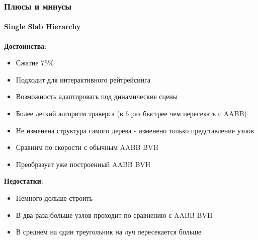 \documentclass{beamer}
\begin{document}
\begin{frame}[t]
    \frametitle{Плюсы и минусы}
    \framesubtitle{Single Slab Hierarchy}

    \textbf{Достоинства}:
    \begin{itemize}
        \item
            Сжатие 75\%
        \item
            Подходит для интерактивного рейтрейсинга
        \item
            Возможность адаптировать под динамические сцены
        \item
            Более легкий алгоритм траверса (в 6 раз быстрее чем пересекать с AABB)
        \item
            Не изменена структура самого дерева - изменено только представление узлов
        \item
            Сравним по скорости с обычным AABB BVH
        \item
            Преобразует уже построенный AABB BVH
    \end{itemize}

    \textbf{Недостатки}:
    \begin{itemize}
        \item
            Немного дольше строить
        \item
            В два раза больше узлов проходит по сравнению с AABB BVH
        \item
            В среднем на один треугольник на луч пересекается больше
    \end{itemize}

\end{frame}
\end{document}
